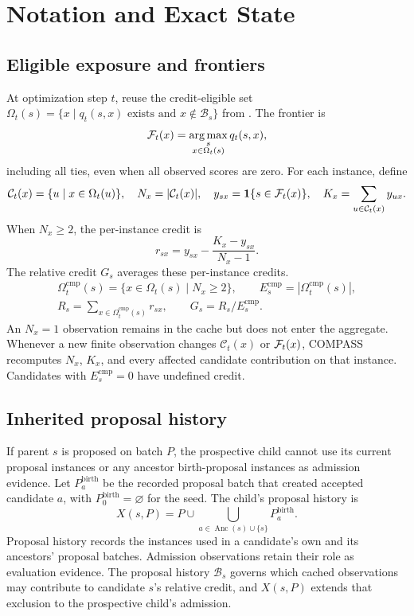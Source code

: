 \section{Notation and Exact State}
\label{app:state}

\subsection{Eligible exposure and frontiers}

At optimization step $t$, reuse the credit-eligible set
$\Omega_t(s)=\{x\mid q_t(s,x)\text{ exists and }x\notin\mathcal B_s\}$ from
.  The frontier is
\[
\mathcal{F}_t(x)=\operatorname*{arg\,max}_{\substack{s\\x\in\Omega_t(s)}}q_t(s,x),
\]
including all ties, even when all observed scores are zero.  For each instance, define
\[
\mathcal C_t(x)=\{u\mid x\in\Omega_t(u)\},\quad N_x=|\mathcal C_t(x)|,\quad
y_{sx}=\mathbf{1}\{s\in\mathcal{F}_t(x)\},\quad K_x=\sum_{u\in\mathcal C_t(x)}y_{ux}.
\]
When $N_x\ge2$, the per-instance credit is
\[
r_{sx}=y_{sx}-\frac{K_x-y_{sx}}{N_x-1}.
\]
The relative credit $G_s$ averages these per-instance credits.
\[
\begin{gathered}
\Omega_t^{\mathrm{cmp}}(s)=\{x\in\Omega_t(s)\mid N_x\ge2\},\qquad
E_s^{\mathrm{cmp}}=|\Omega_t^{\mathrm{cmp}}(s)|,\\
R_s=\sum_{x\in\Omega_t^{\mathrm{cmp}}(s)}r_{sx},\qquad
G_s=R_s/E_s^{\mathrm{cmp}}.
\end{gathered}
\]
An $N_x=1$ observation remains in the cache but does not enter the aggregate.
Whenever a new finite observation changes $\mathcal C_t(x)$ or $\mathcal{F}_t(x)$,
COMPASS recomputes $N_x$, $K_x$, and every affected candidate contribution on
that instance.  Candidates with $E_s^{\mathrm{cmp}}=0$ have undefined credit.

\subsection{Inherited proposal history}

If parent $s$ is proposed on batch $P$, the prospective child cannot use its
current proposal instances or any ancestor birth-proposal instances as
admission evidence.  Let $P_a^{\mathrm{birth}}$ be the recorded proposal batch
that created accepted candidate $a$, with $P_0^{\mathrm{birth}}=\varnothing$
for the seed.  The child's proposal history is
\[
X(s,P)=P\cup\bigcup_{a\in\operatorname{Anc}(s)\cup\{s\}}
P_a^{\mathrm{birth}}.
\]
Proposal history records the instances used in a candidate's own and its
ancestors' proposal batches.  Admission observations retain their role as evaluation evidence.
The proposal history $\mathcal B_s$
governs which cached observations may contribute to candidate $s$'s relative
credit, and $X(s,P)$ extends that exclusion to the prospective child's admission.

